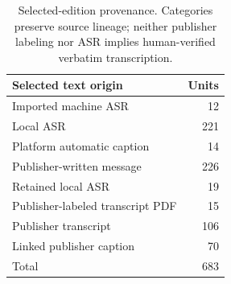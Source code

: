 \begin{table}[t]
\centering\small
\begin{tabular}{lr}
\toprule
Selected text origin & Units \\
\midrule
Imported machine ASR & 12 \\
Local ASR & 221 \\
Platform automatic caption & 14 \\
Publisher-written message & 226 \\
Retained local ASR & 19 \\
Publisher-labeled transcript PDF & 15 \\
Publisher transcript & 106 \\
Linked publisher caption & 70 \\
\midrule
Total & 683 \\
\bottomrule
\end{tabular}
\caption{Selected-edition provenance. Categories preserve source lineage; neither publisher labeling nor ASR implies human-verified verbatim transcription.}
\label{tab:origins}
\end{table}
